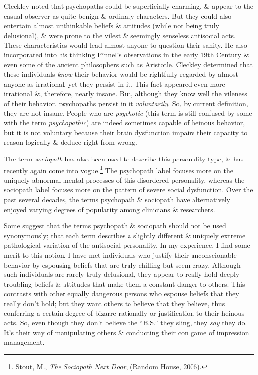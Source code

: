 \documentclass{article}
\numberwithin{equation}{section}
\begin{document}
Cleckley noted that psychopaths could be superficially charming, \& appear to the casual observer as quite benign \& ordinary characters. But they could also entertain almost unthinkable beliefs \& attitudes (while not being truly delusional), \& were prone to the vilest \& seemingly senseless antisocial acts. These characteristics would lead almost anyone to question their sanity. He also incorporated into his thinking Pinnel's observations in the early 19th Century \& even some of the ancient philosophers such as Aristotle. Cleckley determined that these individuals \textit{know} their behavior would be rightfully regarded by almost anyone as irrational, yet they persist in it. This fact appeared even more irrational \&, therefore, nearly insane. But, although they know well the vileness of their behavior, psychopaths persist in it \textit{voluntarily}. So, by current definition, they are not insane. People who are \textit{psychotic} (this term is still confused by some with the term \textit{psychopathic}) are indeed sometimes capable of heinous behavior, but it is not voluntary because their brain dysfunction impairs their capacity to reason logically \& deduce right from wrong.

The term \textit{sociopath} has also been used to describe this personality type, \& has recently again come into vogue.\footnote{Stout, M., \textit{The Sociopath Next Door}, (Random House, 2006).} The psychopath label focuses more on the uniquely abnormal mental processes of this disordered personality, whereas the sociopath label focuses more on the pattern of severe social dysfunction. Over the past several decades, the terms psychopath \& sociopath have alternatively enjoyed varying degrees of popularity among clinicians \& researchers.

Some suggest that the terms psychopath \& sociopath should not be used synonymously; that each term describes a slightly different \& uniquely extreme pathological variation of the antisocial personality. In my experience, I find some merit to this notion. I have met individuals who justify their unconscionable behavior by espousing beliefs that are truly chilling but seem crazy. Although such individuals are rarely truly delusional, they appear to really hold deeply troubling beliefs \& attitudes that make them a constant danger to others. This contrasts with other equally dangerous persons who espouse beliefs that they really don't hold; but they want others to believe that they believe, thus conferring a certain degree of bizarre rationally or justification to their heinous acts. So, even though they don't believe the ``B.S.'' they sling, they \textit{say} they do. It's their way of manipulating others \& conducting their con game of impression management.
\end{document}
